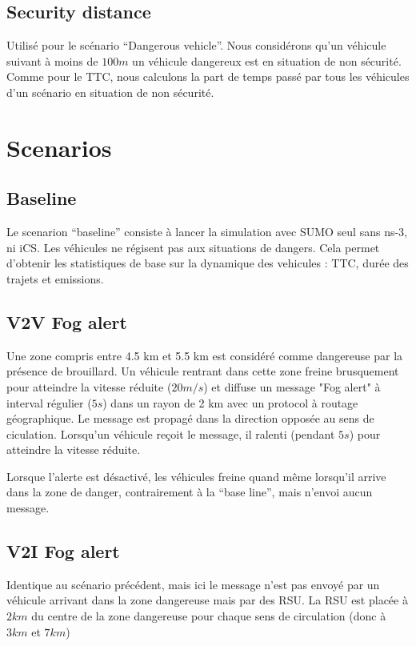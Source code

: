 \documentclass[a4paper,10pt]{report}
\begin{document}
\subsection{Security distance}

Utilisé pour le scénario ``Dangerous vehicle''. Nous considérons qu'un véhicule suivant à moins de $100 m$ un véhicule dangereux est en situation de non sécurité. Comme pour le TTC, nous calculons la part de temps passé par tous les véhicules d'un scénario en situation de non sécurité.

\section{Scenarios}

\subsection{Baseline}

Le scenarion ``baseline'' consiste à lancer la simulation avec SUMO seul sans ns-3, ni iCS. Les véhicules ne régisent pas aux situations de dangers. Cela permet d'obtenir les statistiques de base sur la dynamique des vehicules : TTC, durée des trajets et emissions.

\subsection{V2V Fog alert}

Une zone compris entre 4.5 km et 5.5 km est considéré comme dangereuse par la présence de brouillard. Un véhicule rentrant dans cette zone freine brusquement pour atteindre la vitesse réduite ($20 m/s$) et diffuse un message "Fog alert" à interval régulier ($5 s$) dans un rayon de 2 km avec un protocol à routage géographique. Le message est propagé dans la direction opposée au sens de ciculation. Lorsqu'un véhicule reçoit le message, il ralenti (pendant $5s$) pour atteindre la vitesse réduite.

Lorsque l'alerte est désactivé, les véhicules freine quand même lorsqu'il arrive dans la zone de danger, contrairement à la ``base line'', mais n'envoi aucun message.


\subsection{V2I Fog alert}

Identique au scénario précédent, mais ici le message n'est pas envoyé par un véhicule arrivant dans la zone dangereuse mais par des RSU. La RSU est placée à $2 km$ du centre de la zone dangereuse pour chaque sens de circulation (donc à $3 km$ et $7 km$)
\end{document}
